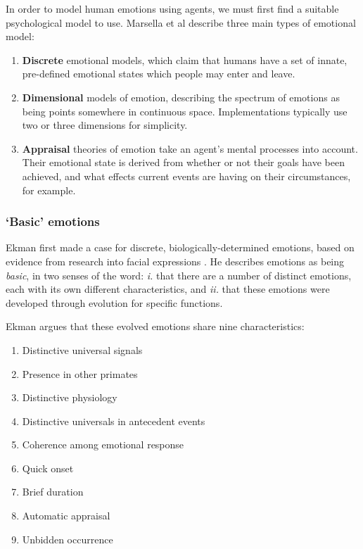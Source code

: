 In order to model human emotions using agents, we must first find a suitable psychological model to use. Marsella et al describe three main types of emotional model:

\begin{enumerate}
 \item \textbf{Discrete} emotional models, which claim that humans have a set of innate, pre-defined emotional states which people may enter and leave.
 \item \textbf{Dimensional} models of emotion, describing the spectrum of emotions as being points somewhere in continuous space. Implementations typically use two or three dimensions for simplicity.
 \item \textbf{Appraisal} theories of emotion take an agent's mental processes into account. Their emotional state is derived from whether or not their goals have been achieved, and what effects current events are having on their circumstances, for example.
\end{enumerate}

\subsubsection{`Basic' emotions}
Ekman first made a case for discrete, biologically-determined emotions, based on evidence from research into facial expressions \citep{ekman1992argument}. He describes emotions as being \emph{basic}, in two senses of the word: \emph{i.} that there are a number of distinct emotions, each with its own different characteristics, and \emph{ii.} that these emotions were developed through evolution for specific functions.

Ekman argues that these evolved emotions share nine characteristics:

\begin{enumerate}
  \item Distinctive universal signals
  \item Presence in other primates
  \item Distinctive physiology
  \item Distinctive universals in antecedent events
  \item Coherence among emotional response
  \item Quick onset
  \item Brief duration
  \item Automatic appraisal
  \item Unbidden occurrence
\end{enumerate}

